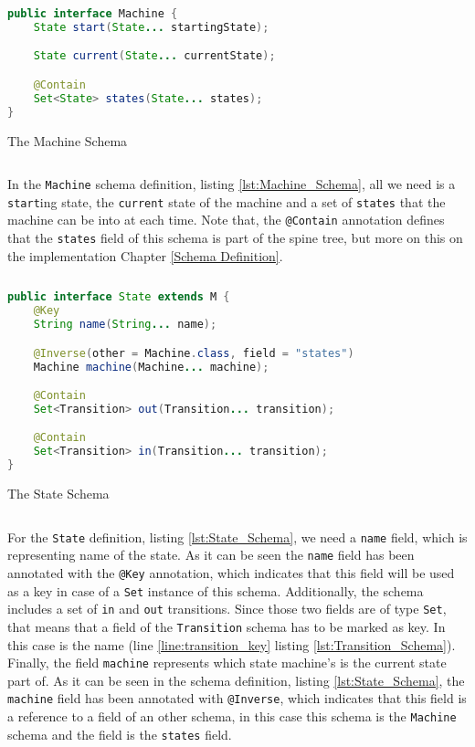 \begin{sourcecode}[H]
	\begin{lstlisting}[language=Java,escapechar=|]
public interface Machine {
	State start(State... startingState);

	State current(State... currentState);

	@Contain
	Set<State> states(State... states);
}
	\end{lstlisting}
	\caption{The Machine Schema}
	\label{lst:Machine_Schema}
\end{sourcecode}

In the \texttt{Machine} schema definition, listing \ref{lst:Machine_Schema}, all we need is a \texttt{start}ing state, the \texttt{current} state of the machine and a set of \texttt{states} that the machine can be into at each time.
Note that, the \texttt{@Contain} annotation defines that the \texttt{states} field of this schema is part of the spine tree, but more on this on the implementation Chapter \ref{Schema Definition}.

\begin{sourcecode}[H]
	\begin{lstlisting}[language=Java,escapechar=|]
public interface State extends M {
	@Key
	String name(String... name);

	@Inverse(other = Machine.class, field = "states")
	Machine machine(Machine... machine);

	@Contain
	Set<Transition> out(Transition... transition);

	@Contain
	Set<Transition> in(Transition... transition);
}
	\end{lstlisting}
	\caption{The State Schema}
	\label{lst:State_Schema}
\end{sourcecode}

For the \texttt{State} definition, listing \ref{lst:State_Schema}, we need a \texttt{name} field, which is representing name of the state. 
As it can be seen the \texttt{name} field has been annotated with the \texttt{@Key} annotation, which indicates that this field will be used as a key in case of a \texttt{Set} instance of this schema.
Additionally, the schema includes a set of \texttt{in} and \texttt{out} transitions.
Since those two fields are of type \texttt{Set}, that means that a field of the \texttt{Transition} schema has to be marked as key.
In this case is the name (line \ref{line:transition_key} listing \ref{lst:Transition_Schema}).
Finally, the field \texttt{machine} represents which state machine's is the current state part of. 
As it can be seen in the schema definition, listing \ref{lst:State_Schema}, the \texttt{machine} field has been annotated with \texttt{@Inverse}, which indicates that this field is a reference to a field of an other schema, in this case this schema is the \texttt{Machine} schema and the field is the \texttt{states} field.

